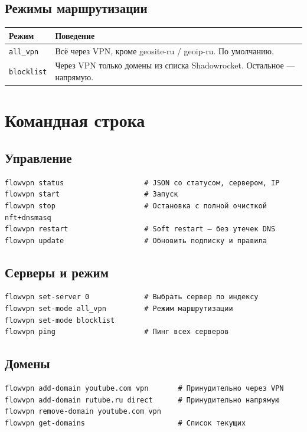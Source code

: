 \documentclass[11pt,a4paper]{article}
\begin{document}
\subsection{Режимы маршрутизации}

\begin{tabularx}{\textwidth}{l X}
\toprule
\textbf{Режим} & \textbf{Поведение} \\
\midrule
\texttt{all\_vpn} & Всё через VPN, кроме geosite-ru / geoip-ru. По умолчанию. \\
\texttt{blocklist} & Через VPN только домены из списка Shadowrocket. Остальное — напрямую. \\
\bottomrule
\end{tabularx}

\section{Командная строка}

\subsection{Управление}

\begin{lstlisting}
flowvpn status                   # JSON со статусом, сервером, IP
flowvpn start                    # Запуск
flowvpn stop                     # Остановка с полной очисткой nft+dnsmasq
flowvpn restart                  # Soft restart — без утечек DNS
flowvpn update                   # Обновить подписку и правила
\end{lstlisting}

\subsection{Серверы и режим}

\begin{lstlisting}
flowvpn set-server 0             # Выбрать сервер по индексу
flowvpn set-mode all_vpn         # Режим маршрутизации
flowvpn set-mode blocklist
flowvpn ping                     # Пинг всех серверов
\end{lstlisting}

\subsection{Домены}

\begin{lstlisting}
flowvpn add-domain youtube.com vpn       # Принудительно через VPN
flowvpn add-domain rutube.ru direct      # Принудительно напрямую
flowvpn remove-domain youtube.com vpn
flowvpn get-domains                      # Список текущих
\end{lstlisting}
\end{document}
